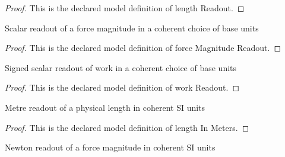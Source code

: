 \begin{proof}
  This is the declared model definition of length Readout.
\end{proof}
\begin{definition}
  \label{def:physics:phyx-mini-0809:phyxminiproblems-problemphyxmini0809-forcemagnitudereadout}
  Scalar readout of a force magnitude in a coherent choice of base units
\end{definition}
\begin{proof}
  This is the declared model definition of force Magnitude Readout.
\end{proof}
\begin{definition}
  \label{def:physics:phyx-mini-0809:phyxminiproblems-problemphyxmini0809-workreadout}
  Signed scalar readout of work in a coherent choice of base units
\end{definition}
\begin{proof}
  This is the declared model definition of work Readout.
\end{proof}
\begin{definition}
  \label{def:physics:phyx-mini-0809:phyxminiproblems-problemphyxmini0809-lengthinmeters}
  Metre readout of a physical length in coherent SI units
\end{definition}
\begin{proof}
  This is the declared model definition of length In Meters.
\end{proof}
\begin{definition}
  \label{def:physics:phyx-mini-0809:phyxminiproblems-problemphyxmini0809-forcemagnitudeinnewtons}
  Newton readout of a force magnitude in coherent SI units
\end{definition}
